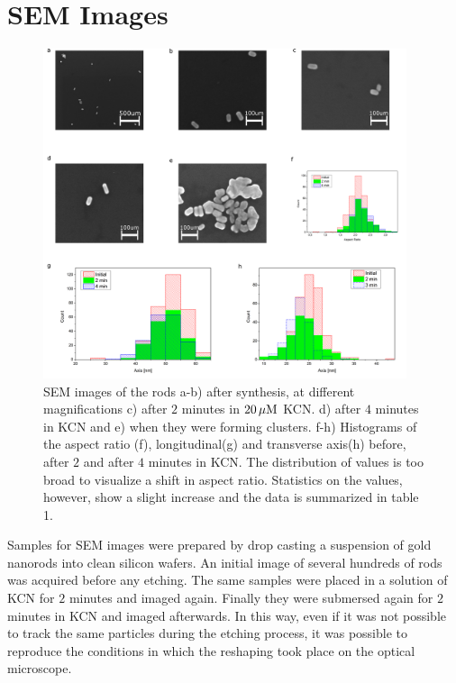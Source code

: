 \newpage

\section{SEM Images}
\label{KCN_SEM}
\begin{figure}[tp]
 \centering
 \includegraphics[width=0.95\textwidth]{Chapters/02_KCN/Figures/04_Supporting/02_SEM/sem.png}
 \caption{SEM images of the rods a-b) after synthesis, at different
 magnifications c) after $2$ minutes in $20\,\mu\textrm{M}$ KCN. d) after $4$ minutes in KCN
 and e) when they were forming clusters. f-h) Histograms of the aspect ratio
 (f), longitudinal(g) and transverse axis(h) before, after $2$ and after $4$
 minutes in KCN. The distribution of values is too broad to visualize a shift in
 aspect ratio.
 Statistics on the values, however, show a slight increase and the data is
 summarized in table 1. }
 \label{fig:SEM}
\end{figure}

Samples for SEM images were prepared by drop casting a suspension of gold
nanorods into clean silicon wafers. An initial image of several hundreds of rods
was acquired before any etching. The same samples were placed in a solution of KCN
for $2$ minutes and imaged again. Finally they were submersed again for $2$
minutes in KCN and imaged afterwards. In this way, even if it was not possible
to track the same particles during the etching process, it was possible to
reproduce the conditions in which the reshaping took place on the optical
microscope.

